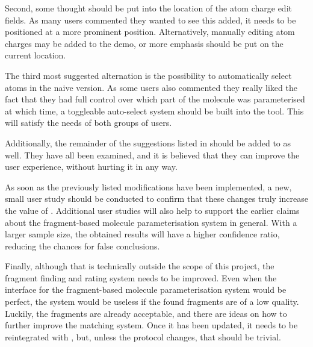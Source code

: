 Second, some thought should be put into the location of the atom charge edit fields. As many users commented they wanted to see this added, it needs to be positioned at a more prominent position. Alternatively, manually editing atom charges may be added to the demo, or more emphasis should be put on the current location.

The third most suggested alternation is the possibility to automatically select atoms in the naive version. As some users also commented they really liked the fact that they had full control over which part of the molecule was parameterised at which time, a toggleable auto-select system should be built into the tool. This will satisfy the needs of both groups of users.

Additionally, the remainder of the suggestions listed in  should be added to \oframp{} as well. They have all been examined, and it is believed that they can improve the user experience, without hurting it in any way.

As soon as the previously listed modifications have been implemented, a new, small user study should be conducted to confirm that these changes truly increase the value of \oframp. Additional user studies will also help to support the earlier claims about the fragment-based molecule parameterisation system in general. With a larger sample size, the obtained results will have a higher confidence ratio, reducing the chances for false conclusions.

Finally, although that is technically outside the scope of this project, the fragment finding and rating system needs to be improved. Even when the interface for the fragment-based molecule parameterisation system would be perfect, the system would be useless if the found fragments are of a low quality. Luckily, the fragments are already acceptable, and there are ideas on how to further improve the matching system. Once it has been updated, it needs to be reintegrated with \oframp, but, unless the protocol changes, that should be trivial.
